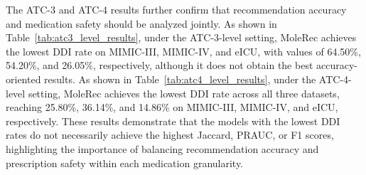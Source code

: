 \documentclass[manuscript,review]{acmart}
\begin{document}
The ATC-3 and ATC-4 results further confirm that recommendation accuracy and medication safety should be analyzed jointly. As shown in Table~\ref{tab:atc3_level_results}, under the ATC-3-level setting, MoleRec achieves the lowest DDI rate on MIMIC-III, MIMIC-IV, and eICU, with values of 64.50\%, 54.20\%, and 26.05\%, respectively, although it does not obtain the best accuracy-oriented results. As shown in Table~\ref{tab:atc4_level_results}, under the ATC-4-level setting, MoleRec achieves the lowest DDI rate across all three datasets, reaching 25.80\%, 36.14\%, and 14.86\% on MIMIC-III, MIMIC-IV, and eICU, respectively. These results demonstrate that the models with the lowest DDI rates do not necessarily achieve the highest Jaccard, PRAUC, or F1 scores, highlighting the importance of balancing recommendation accuracy and prescription safety within each medication granularity.




\end{document}
